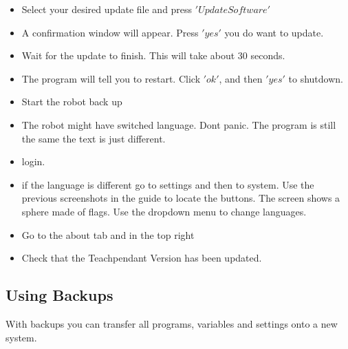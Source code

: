 \documentclass{article}
\begin{document}
\begin{itemize}
\item Select your desired update file and press $'Update Software'$
\item A confirmation window will appear. Press $'yes'$ you do want to update.
\item Wait for the update to finish. This will take about 30 seconds. 
\item The program will tell you to restart. Click $'ok'$, and then $'yes'$ to shutdown.
\item Start the robot back up
\item The robot might have switched language. Dont panic. The program is still the same the text is just different. 
\item login. 
\item if the language is different go to settings and then to system. Use the previous screenshots in the guide to locate the buttons. The screen shows a sphere made of flags. Use the dropdown menu to change languages.
\item Go to the about tab and in the top right
\item Check that the Teachpendant Version has been updated. 
\end{itemize}

\subsection{Using Backups} 
With backups you can transfer all programs, variables and settings onto a new system. 
\end{document}
